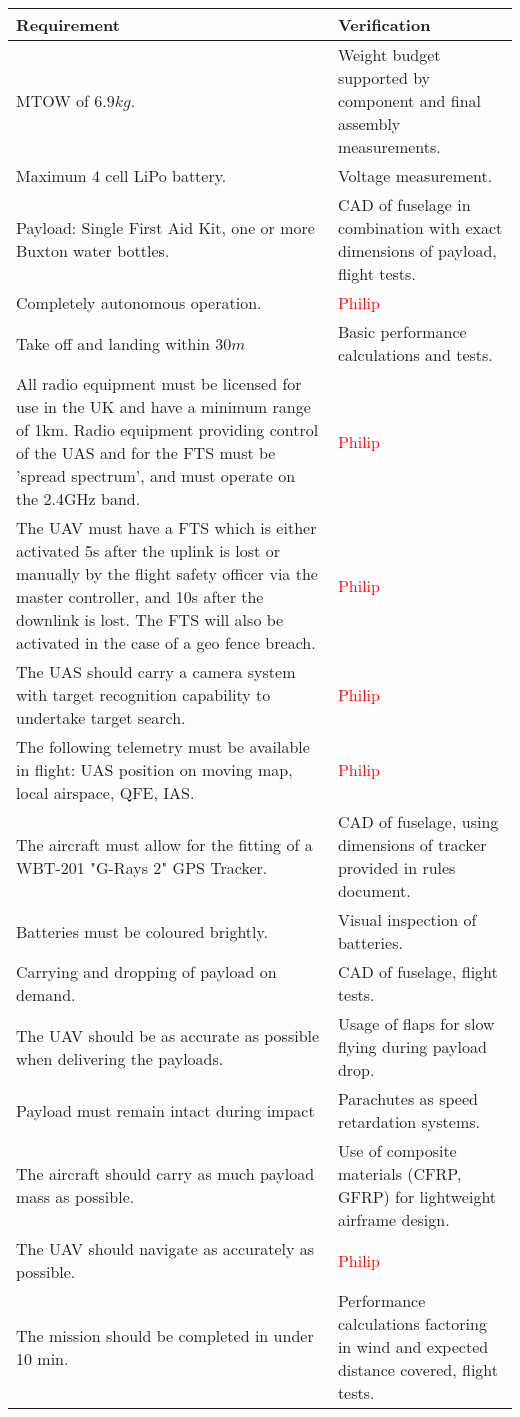 \begin{longtable}{@{\makebox[0.08\textwidth][l]{\rownumber}} | p{} | p{}}
	\textbf{Requirement} & \textbf{Verification} 
	\gdef\rownumber{Req.\space\stepcounter{magicrownumbers}\arabic{magicrownumbers}} \\ \hline
	MTOW of $6.9kg$. & Weight budget supported by component and final assembly measurements.\\ \hline
	Maximum 4 cell LiPo battery. & Voltage measurement. \\ \hline
	Payload: Single First Aid Kit, one or more Buxton water bottles. & CAD of fuselage in combination with exact dimensions of payload, flight tests. \\ \hline
	Completely autonomous operation. & \textcolor{red}{Philip} \\ \hline
	Take off and landing within $30\si{m}$ & Basic performance calculations and tests. \\ \hline
	All radio equipment must be licensed for use in the UK and have a minimum range of 1km. Radio equipment providing control of the UAS and for the FTS must be 'spread spectrum', and must operate on the 2.4GHz band. & \textcolor{red}{Philip} \\ \hline
	The UAV must have a FTS which is either activated 5s after the uplink is lost or manually by the flight safety officer via the master controller, and 10s after the downlink is lost. The FTS will also be activated in the case of a geo fence breach. & \textcolor{red}{Philip} \\ \hline
	The UAS should carry a camera system with target recognition capability to undertake target search. & \textcolor{red}{Philip} \\ \hline
	The following telemetry must be available in flight: UAS position on moving map, local airspace, QFE, IAS. & \textcolor{red}{Philip} \\ \hline
	The aircraft must allow for the fitting of a WBT-201 "G-Rays 2" GPS Tracker. & CAD of fuselage, using dimensions of tracker provided in rules document. \\ \hline
	Batteries must be coloured brightly. & Visual inspection of batteries. \\ \hline
	Carrying and dropping of payload on demand. & CAD of fuselage, flight tests.\\ \hline
	The UAV should be as accurate as possible when delivering the payloads. & Usage of flaps for slow flying during payload drop. \\ \hline
	Payload must remain intact during impact & Parachutes as speed retardation systems. \\ \hline
	The aircraft should carry as much payload mass as possible. & Use of composite materials (CFRP, GFRP) for lightweight airframe design. \\ \hline
	The UAV should navigate as accurately as possible. & \textcolor{red}{Philip} \\ \hline
	The mission should be completed in under 10 min. & Performance calculations factoring in wind and expected distance covered, flight tests. \\
\end{longtable}

